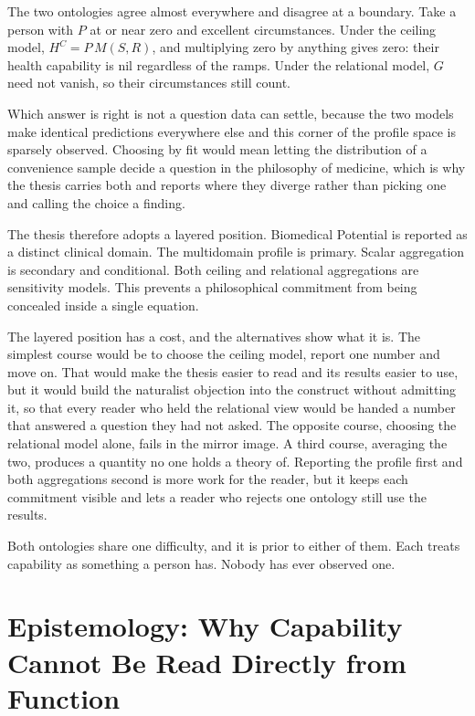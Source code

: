 \begin{reading}
The two ontologies agree almost everywhere and disagree at a boundary. Take a
person with $P$ at or near zero and excellent circumstances. Under the ceiling
model, $H^C=P\,M(S,R)$, and multiplying zero by anything gives zero: their
health capability is nil regardless of the ramps. Under the relational model,
$G$ need not vanish, so their circumstances still count.

Which answer is right is not a question data can settle, because the two
models make identical predictions everywhere else and this corner of the
profile space is sparsely observed. Choosing by fit would mean letting the
distribution of a convenience sample decide a question in the philosophy of
medicine, which is why the thesis carries both and reports where they diverge
rather than picking one and calling the choice a finding.
\end{reading}

The thesis therefore adopts a layered position. Biomedical Potential is
reported as a distinct clinical domain. The multidomain profile is primary.
Scalar aggregation is secondary and conditional. Both ceiling and relational
aggregations are sensitivity models. This prevents a philosophical commitment
from being concealed inside a single equation.

The layered position has a cost, and the alternatives show what it is. The
simplest course would be to choose the ceiling model, report one number and
move on. That would make the thesis easier to read and its results easier to
use, but it would build the naturalist objection into the construct without
admitting it, so that every reader who held the relational view would be
handed a number that answered a question they had not asked. The opposite
course, choosing the relational model alone, fails in the mirror image. A
third course, averaging the two, produces a quantity no one holds a theory of.
Reporting the profile first and both aggregations second is more work for the
reader, but it keeps each commitment visible and lets a reader who rejects one
ontology still use the results.

Both ontologies share one difficulty, and it is prior to either of them. Each
treats capability as something a person has. Nobody has ever observed one.

\section{Epistemology: Why Capability Cannot Be Read Directly from Function}
\label{sec:lit-epistemology}


